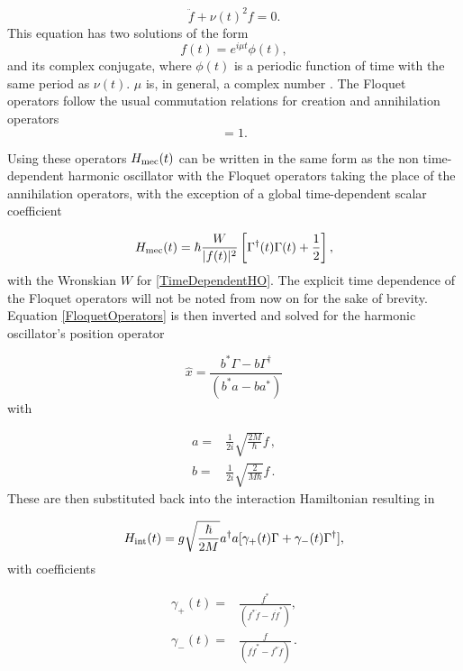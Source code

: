 \documentclass[reprint, amsmath,amssymb, aps,pra]{revtex4-1}
\begin{document}
\begin{equation} \label{TimeDependentHO}
\ddot{f} + \nu(t)^2f=0.
\end{equation} This equation has two solutions \cite{HanngiFM} of the form
\begin{equation}
f(t) = e^{i\mu t}\phi(t), 
\end{equation}
and its complex conjugate, where $\phi(t)$ is a periodic function of
time with the same period as $\nu(t)$. $\mu$ is, in general, a complex
number \cite{WardFT}. The Floquet operators follow the usual
commutation relations for creation and annihilation operators
\begin{equation}
[\Gamma(t)^\dagger,\Gamma(t)]=1.
\end{equation}

 Using these operators $H_{\rm mec}(t)$ can be written in the same form as the non time-dependent harmonic oscillator with the Floquet operators taking the place of the annihilation operators, with the exception of a global time-dependent scalar coefficient  \cite{BrownPT}

\begin{equation}
H_{\rm mec}(t) = \hbar\frac{W}{|f(t)|^2}\left[\Gamma^\dagger(t)\Gamma(t) + \frac{1}{2}\right],
\end{equation}
with the Wronskian $W$ for \eqref{TimeDependentHO}. The explicit time dependence of the Floquet operators will not be noted from now on for the sake of brevity. Equation
\eqref{FloquetOperators} is then inverted and solved for the harmonic
oscillator's position operator \cite{TesisMaestria}

\begin{equation}
\hat{x} = \frac{b^* \Gamma - b\Gamma^\dagger}{(b^*a-ba^*)}
\end{equation} with

\begin{align}
a =&  \frac{1}{2i}\sqrt{\frac{2M}{\hbar}}\dot{f}\, , \\
b =&  \frac{1}{2i}\sqrt{\frac{2}{M\hbar}}f\, .
\end{align}
These are then substituted back into the interaction Hamiltonian
resulting in

\begin{equation}
H_{\rm int}(t) = g\sqrt{\frac{\hbar}{2M}}a^\dagger a[\gamma_+(t)\Gamma +\gamma_-(t)\Gamma^\dagger],
\end{equation} with coefficients

\begin{align*}
\gamma_+(t)=&\frac{f^*}{(f^*\dot{f}-f\dot{f}^*)},\\
\gamma_-(t)=&\frac{f}{(f\dot{f}^*-f^*\dot{f})}\, .
\end{align*} 
\end{document}
